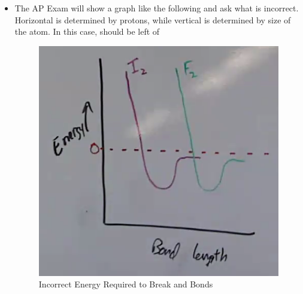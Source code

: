 \documentclass[12pt]{article}
\begin{document}
\begin{itemize}
    \newpage
  \item The AP Exam will show a graph like the following and ask what is incorrect. Horizontal is determined by protons, while vertical is determined by size of the atom. In this case,  should be left of 

    \begin{figure}[h]
      \centering
      \includegraphics[width=.7\textwidth]{Figures/I2F2.png}
      \caption{Incorrect Energy Required to Break  and  Bonds}
      \label{fig:2}
    \end{figure}

\end{itemize}
\end{document}
